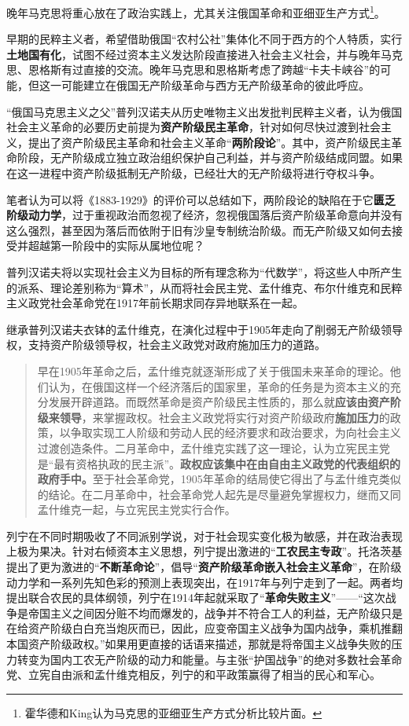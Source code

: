 晚年马克思将重心放在了政治实践上，尤其关注俄国革命和亚细亚生产方式\footnote{霍华德和King认为马克思的亚细亚生产方式分析比较片面。}。

早期的民粹主义者，希望借助俄国“农村公社”集体化不同于西方的个人特质，实行\textbf{土地国有化}，试图不经过资本主义发达阶段直接进入社会主义社会，并与晚年马克思、恩格斯有过直接的交流。晚年马克思和恩格斯考虑了跨越“卡夫卡峡谷”的可能，但这一可能建立在俄国无产阶级革命与西方无产阶级革命的彼此呼应。\cite{mamincui}

“俄国马克思主义之父”普列汉诺夫从历史唯物主义出发批判民粹主义者，认为俄国社会主义革命的必要历史前提为\textbf{资产阶级民主革命}，针对如何尽快过渡到社会主义，提出了资产阶级民主革命和社会主义革命“\textbf{两阶段论}”。其中，资产阶级民主革命阶段，无产阶级成立独立政治组织保护自己利益，并与资产阶级结成同盟。如果在这一进程中资产阶级抵制无产阶级，已经壮大的无产阶级将进行夺权斗争。

笔者认为可以将《1883-1929》的评价可以总结如下，两阶段论的缺陷在于它\textbf{匮乏阶级动力学}，过于重视政治而忽视了经济，忽视俄国落后资产阶级革命意向并没有这么强烈，甚至因为落后而依附于旧有沙皇专制统治阶级。而无产阶级又如何去接受并超越第一阶段中的实际从属地位呢？

普列汉诺夫将以实现社会主义为目标的所有理念称为“代数学”，将这些人中所产生的派系、理论差别称为“算术”，从而将社会民主党、孟什维克、布尔什维克和民粹主义政党社会革命党在1917年前长期求同存异地联系在一起。

继承普列汉诺夫衣钵的孟什维克，在演化过程中于1905年走向了削弱无产阶级领导权，支持资产阶级领导权，社会主义政党对政府施加压力的道路。

\begin{quotation}早在1905年革命之后，孟什维克就逐渐形成了关于俄国未来革命的理论。他们认为，在俄国这样一个经济落后的国家里，革命的任务是为资本主义的充分发展开辟道路。而既然革命是资产阶级民主性质的，那么就\textbf{应该由资产阶级来领导}，来掌握政权。社会主义政党将实行对资产阶级政府\textbf{施加压力}的政策，以争取实现工人阶级和劳动人民的经济要求和政治要求，为向社会主义过渡创造条件。二月革命中，孟什维克实践了这一理论，认为立宪民主党是“最有资格执政的民主派”。\textbf{政权应该集中在由自由主义政党的代表组织的政府手中。}至于社会革命党，1905年革命的结局使它得出了与孟什维克类似的结论。在二月革命中，社会革命党人起先是尽量避免掌握权力，继而又同孟什维克一起，与立宪民主党实行合作。
\end{quotation}

列宁在不同时期吸收了不同派别学说，对于社会现实变化极为敏感，并在政治表现上极为果决。针对右倾资本主义思想，列宁提出激进的“\textbf{工农民主专政}”。托洛茨基提出了更为激进的“\textbf{不断革命论}”，倡导“\textbf{资产阶级革命嵌入社会主义革命}”，在阶级动力学和一系列先知色彩的预测上表现突出，在1917年与列宁走到了一起。两者均提出联合农民的具体纲领，列宁在1914年起就采取了“\textbf{革命失败主义}”——“这次战争是帝国主义之间因分赃不均而爆发的，战争并不符合工人的利益，无产阶级只是在给资产阶级白白充当炮灰而已，因此，应变帝国主义战争为国内战争，乘机推翻本国资产阶级政权。”\cite{shibaizhuyi}如果用更直接的话语来描述，那就是将帝国主义战争失败的压力转变为国内工农无产阶级的动力和能量。与主张“护国战争”的绝对多数社会革命党、立宪自由派和孟什维克相反，列宁的和平政策赢得了相当的民心和军心。

